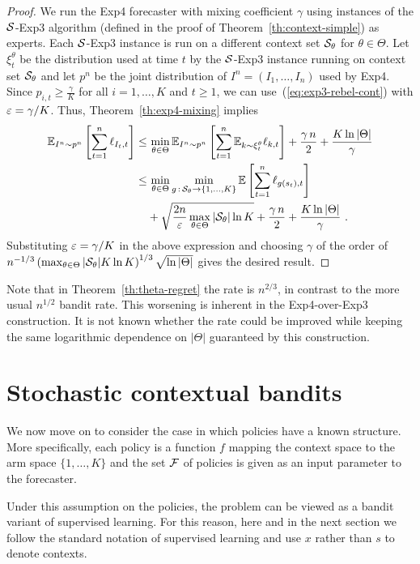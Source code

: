 %
\begin{proof}
We run the Exp4 forecaster with mixing coefficient $\gamma$ using instances of the $\mathcal{S}$-Exp3 algorithm (defined in the proof of Theorem~\ref{th:context-simple}) as experts. Each $\mathcal{S}$-Exp3 instance is run on a different context set $\mathcal{S}_{\theta}$ for $\theta\in\Theta$. Let $\xi_t^{\theta}$ be the distribution used at time $t$ by the $\mathcal{S}$-Exp3 instance running on context set $\mathcal{S}_{\theta}$ and let $p^n$ be the joint distribution of $I^n = (I_1,\dots,I_n)$ used by Exp4. Since $p_{i,t} \ge \tfrac{\gamma}{K}$ for all $i=1,\dots,K$ and $t\ge 1$, we can use~(\ref{eq:exp3-rebel-cont}) with $\varepsilon = \gamma/K$. Thus, Theorem~\ref{th:exp4-mixing} implies
\begin{align*}
    \mathbb{E}_{I^n \sim p^n}\left[ \sum_{t=1}^n \ell_{I_t,t} \right]
\le &\,
    \min_{\theta\in\Theta} \mathbb{E}_{I^n \sim p^n}\left[\sum_{t=1}^n \mathbb{E}_{k \sim \xi_t^\theta} \ell_{k,t} \right]
+
    \frac{\gamma\,n}{2} + \frac{K\ln|\Theta|}{\gamma}
\\ \le &\,
    \min_{\theta\in\Theta} \min_{g \,:\, \mathcal{S}_{\theta}\to\{1,\dots,K\}} \mathbb{E}\left[ \sum_{t=1}^n \ell_{g(s_t),t} \right]
\\ &
    + \sqrt{\frac{2 n}{\varepsilon}\max_{\theta\in\Theta}|\mathcal{S}_{\theta}| \ln K} + \frac{\gamma\,n}{2} + \frac{K\ln |\Theta|}{\gamma}~.
\end{align*}
Substituting $\varepsilon = \gamma/K$ in the above expression and choosing $\gamma$ of the order of
$
	n^{-1/3}\left(\max_{\theta\in\Theta}|\mathcal{S}_{\theta}|K\ln K\right)^{1/3}\sqrt{\ln|\Theta|}
$
gives the desired result.
\end{proof}
%
Note that in Theorem~\ref{th:theta-regret} the rate is $n^{2/3}$, in contrast to the more usual $n^{1/2}$ bandit rate. This worsening is inherent in the Exp4-over-Exp3 construction. It is not known whether the rate could be improved while keeping the same logarithmic dependence on $|\Theta|$ guaranteed by this construction.


\section{Stochastic contextual bandits}
\label{s:context-stochastic}
%
We now move on to consider the case in which policies have a known structure. More specifically, each policy is a function $f$ mapping the context space to the arm space $\{1,\dots,K\}$ and the set $\mathcal{F}$ of policies is given as an input parameter to the forecaster.

Under this assumption on the policies, the problem can be viewed as a bandit variant of supervised learning. For this reason, here and in the next section we follow the standard notation of supervised learning and use $x$ rather than $s$ to denote contexts.

